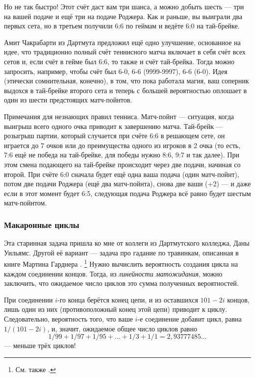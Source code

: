Но не так быстро!
Этот счёт даст вам три шанса, а можно добыть шесть --- три на вашей подаче и ещё три на подаче Роджера.
Как и раньше, вы выиграли два первых сета, но в третьем получили 6:6 по геймам и ведёте 6:0 на тай-брейке.

Амит Чакрабарти из Дартмута предложил ещё одно улучшение, основанное на идее, что традиционно полный счёт теннисного матча включает в себя счёт всех сетов и, если счёт в гейме был 6:6, то также и счёт тай-брейка.
Тогда можно запросить, например, чтобы счёт был 6-0, 6-6 (9999-9997), 6-6 (6-0).
Идея (этически сомнительная, конечно), в том, что пока работала магия, ваш соперник выдохся в тай-брейке второго сета и теперь с большей вероятностью оплошает в один из шести предстоящих матч-пойнтов.

\begin{addedbytheeditors}
Примечания для незнающих правил тенниса.
Матч-пойнт --- ситуация, когда выигрыш всего одного очка приводит к завершению матча.
Тай-брейк --- розыгрыш партии, который
случается при счёте 6:6 в решающем сете, он играется до 7 очков или до
преимущества
одного из игроков в 2 очка (то есть, 7:6 ещё не победа на тай-брейке, для победы нужно 8:6, 9:7 и так далее).
При этом смена подающего на тай-брейке происходит через две подачи, начиная со второй.
При счёте 6:0 сначала будет ещё одна ваша подача (один матч-пойнт), потом две подачи Роджера (ещё два матч-пойнта), снова две ваши (+2) --- и даже если в этот момент будет 6:5, следующая подача Роджера всё равно будет шестым матч-пойнтом.\pr
\end{addedbytheeditors}

\subsubsection*{Макаронные циклы}

Эта старинная задача пришла ко мне от коллеги из Дартмутского колледжа, Даны Уильямс.
Другой её вариант --- задача про гадание по травинкам, описанная в книге Мартина Гарднера \cite[p. 198]{26}.%
\footnote{См. также \cite{meshalkin,bavrin-fribus}. \pr}
Нужно вычислить вероятность создания цикла на каждом соединении концов.
Тогда, из \emph{линейности матожидания}, можно заключить, что ожидаемое число циклов это сумма полученных вероятностей.

При соединении $i$-го конца берётся конец цепи, и из оставшихся $101 - 2i$ концов, лишь один из них (противоположный конец этой цепи) приводит к циклу.
Следовательно, вероятность того, что ваше $i$-е соединение добавит цикл, равна $1/(101 - 2i)$, и, значит, ожидаемое общее число циклов равно 
\[1/99 + 1/97 + 1/95 +\dots + 1/3 + 1/1 = 2{,}93777485\dots\]
--- меньше трёх циклов!

